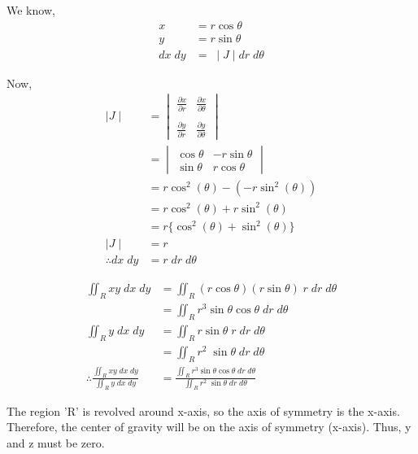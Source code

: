 \documentclass{article}
\begin{document}
\large{
    We know,
    \begin{align*}
        x & = r \cos \theta \\
        y & = r \sin \theta \\
        dx \; dy & = \; \mid J \mid dr \; d\theta
    \end{align*}

Now,
\begin{align*}
    \mid J \mid
    & =
    \begin{vmatrix}
        \frac{\partial x}{\partial r} & \frac{\partial x}{\partial \theta} \\\\
        \frac{\partial y}{\partial r} & \frac{\partial y}{\partial \theta}
    \end{vmatrix}
     \\
    & =
    \begin{vmatrix}
        \cos \theta & -r \sin \theta \\
        \sin \theta & r \cos \theta
    \end{vmatrix} \\
    & = r \cos^2 (\theta) - (-r \sin^2 (\theta)) \\
    & = r \cos^2 (\theta) + r \sin^2 (\theta) \\
    & = r \{ \cos^2 (\theta) + \sin^2 (\theta) \} \\
    \mid J \mid
    & = r \\
    \therefore dx \; dy & = r \; dr \; d\theta
\end{align*}

\begin{align*}
    \iint_R xy \; dx \; dy	& = \iint_R (r \cos \theta) (r \sin \theta) \; r \; dr \; d\theta \\
                            & = \iint_R r^3 \sin \theta \cos \theta \; dr \; d\theta \\
    \iint_R y \; dx \; dy	& = \iint_R r \sin \theta \; r \; dr \; d\theta \\
                            & = \iint_R r^2 \; \sin \theta \; dr \; d\theta \\
    \therefore \frac{\iint_R xy \; dx \; dy}{\iint_R y \; dx \; dy} & = \frac{\iint_R r^3 \sin \theta \cos \theta \; dr \; d\theta}{\iint_R r^2 \; \sin \theta \; dr \; d\theta}
\end{align*}

The region 'R' is revolved around x-axis, so the axis of symmetry is the x-axis. Therefore, the center of gravity will be on the axis of symmetry (x-axis). Thus, y and z must be zero.
}
\end{document}
